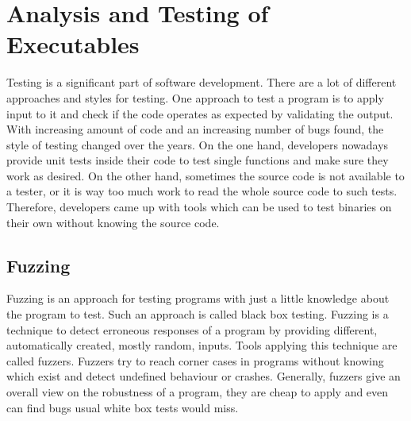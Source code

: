\section{Analysis and Testing of Executables}

Testing is a significant part of software development. There are a lot of
different approaches and styles for testing. One approach to test a program is
to apply input to it and check if the code operates as expected by validating
the output. With increasing amount of code and an increasing number of bugs
found, the style of testing changed over the years. On the one hand, developers
nowadays provide unit tests inside their code to test single functions and make
sure they work as desired. On the other hand, sometimes the source code is not
available to a tester, or it is way too much work to read the whole source code
to such tests. Therefore, developers came up with tools which can be used to
test binaries on their own without knowing the source code.

\subsection{Fuzzing}

Fuzzing is an approach for testing programs with just a little knowledge about
the program to test. Such an approach is called black box testing. Fuzzing is a
technique to detect erroneous responses of a program by providing different,
automatically created, mostly random, inputs. Tools applying this technique are
called fuzzers. Fuzzers try to reach corner cases in programs without knowing
which exist and detect undefined behaviour or crashes. Generally, fuzzers give
an overall view on the robustness of a program, they are cheap to apply and even
can find bugs usual white box tests would miss.


